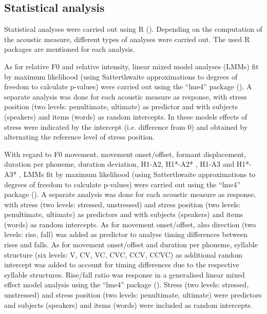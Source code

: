 \subsection{Statistical analysis} \label{sec225}
Statistical analyses were carried out using R (\citealt{rcoreteam_project_2017}). Depending on the computation of the acoustic measure, different types of analyses were carried out. The used R packages are mentioned for each analysis.\par

As for relative F0 and relative intensity, linear mixed model analyses (LMMs) fit by maximum likelihood (using Satterthwaite approximations to degrees of freedom to calculate p-values) were carried out using the ``lme4'' package (\citealt{bates_fitting_2015}). A separate analysis was done for each acoustic measure as response, with stress position (two levels: penultimate, ultimate) as predictor and with subjects (speakers) and items (words) as random intercepts. In these models effects of stress were indicated by the intercept (i.e. difference from 0) and obtained by alternating the reference level of stress position.\par

With regard to F0 movement, movement onset/offset, formant displacement, duration per phoneme, duration deviation, H1-A2, H1*-A2* , H1-A3 and H1*-A3* , LMMs fit by maximum likelihood (using Satterthwaite approximations to degrees of freedom to calculate p-values) were carried out using the ``lme4'' package (\citealt{bates_fitting_2015}). A separate analysis was done for each acoustic measure as response, with stress (two levels: stressed, unstressed) and stress position (two levels: penultimate, ultimate) as predictors and with subjects (speakers) and items (words) as random intercepts. As for movement onset/offset, also direction (two levels: rise, fall) was added as predictor to analyse timing differences between rises and falls. As for movement onset/offset and duration per phoneme, syllable structure (six levels: V, CV, VC, CVC, CCV, CCVC) as additional random intercept was added to account for timing differences due to the respective syllable structures. Rise/fall ratio was response in a generalised linear mixed effect model analysis using the ``lme4'' package (\citealt{bates_fitting_2015}). Stress (two levels: stressed, unstressed) and stress position (two levels: penultimate, ultimate) were predictors and subjects (speakers) and items (words) were included as random intercepts.\par

